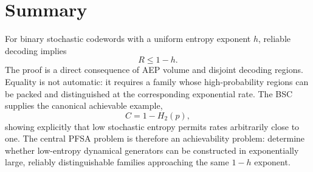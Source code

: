 \documentclass[11pt]{article}
\begin{document}
\section{Summary}
For binary stochastic codewords with a uniform entropy exponent $h$, reliable decoding implies
\[
R\le1-h.
\]
The proof is a direct consequence of AEP volume and disjoint decoding regions.  Equality is not automatic: it requires a family whose high-probability regions can be packed and distinguished at the corresponding exponential rate.  The BSC supplies the canonical achievable example,
\[
C=1-H_2(p),
\]
showing explicitly that low stochastic entropy permits rates arbitrarily close to one.  The central PFSA problem is therefore an achievability problem: determine whether low-entropy dynamical generators can be constructed in exponentially large, reliably distinguishable families approaching the same $1-h$ exponent.
\end{document}
